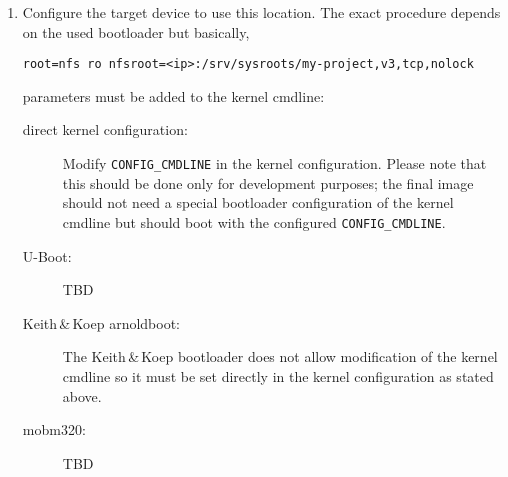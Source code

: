   \begin{enumerate}[resume]
  \item Configure the target device to use this location.  The exact
    procedure depends on the used bootloader but basically,
\begin{verbatim}
root=nfs ro nfsroot=<ip>:/srv/sysroots/my-project,v3,tcp,nolock
\end{verbatim}
    parameters must be added to the kernel cmdline:

    \begin{description}
    \item[direct kernel configuration:] Modify
      \texttt{CONFIG\_CMDLINE} in the kernel configuration.  Please
      note that this should be done only for development purposes; the
      final image should not need a special bootloader configuration
      of the kernel cmdline but should boot with the configured
      \texttt{CONFIG\_CMDLINE}.
    \item[U-Boot:] TBD
    \item[Keith\,\&\,Koep arnoldboot:] The Keith\,\&\,Koep bootloader
      does not allow modification of the kernel cmdline so it must be
      set directly in the kernel configuration as stated above.
    \item[mobm320:] TBD
    \end{description}
  \end{enumerate}


